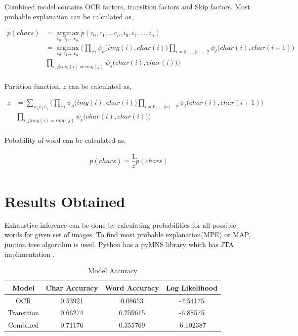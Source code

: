 \documentclass[paper=a4, fontsize=11pt]{scrartcl} %
\DeclareMathOperator*{\argmax}{argmax}
\newcommand*{\argmaxl}{\argmax\limits}
\numberwithin{equation}{section} %
\numberwithin{figure}{section} %
\numberwithin{table}{section} %
\begin{document}
Combined model contains OCR factors, transition factors and Skip factors. Most probable explanation can be calculated as,

\begin{align*}
	\tilde{p}(chars) & = \argmaxl_{c_0,c_1,...c_n} \tilde{p}(c_0,c_1,...c_n,i_0,i_1,...,i_n) \\
					 & = \argmaxl_{c_0,c_1,...c_n} \bigg( \displaystyle \prod_{\forall i}^{}  \psi_{o}\big(img(i),char(i)\big) \displaystyle \prod_{i=0,...,|w|-2}^{}  \psi_{t}\big(char(i),char(i+1)\big) \\ & \displaystyle \prod_{i,j|img(i)=img(j)}^{} \psi_{s}\big(char(i),char(i)\big) \bigg)\\
\end{align*}

Partition function, $z$ can be calculated as,

\begin{align*}
	z & = \displaystyle \sum_{\psi_{o} \psi_{t} \psi_{s}}^{} \bigg( \displaystyle \prod_{\forall i}^{}  \psi_{o}\big(img(i),char(i)\big) \displaystyle \prod_{i=0,...,|w|-2}^{}  \psi_{t}\big(char(i),char(i+1)\big) \\ & \displaystyle \prod_{i,j|img(i)=img(j)}^{} \psi_{s}\big(char(i),char(i)\big) \bigg)\\
\end{align*}

Pobability of word can be calculated as,

\begin{align*}
	p(chars) = \dfrac{1}{z} \tilde{p}(chars) \\
\end{align*}

\section{Results Obtained}

Exhaustive inference can be done by calculating probabilities for all possible words for given set of images. To find most probable explanation(MPE) or MAP, juntion tree algorithm is used. Python has a pyMNS library which has JTA implimentation \cite{pymns}.

\begin{table}[h!]
  \begin{center}
    \begin{tabular}{||c c c c||} 
    \hline
      Model & Char Accuracy & Word Accuracy & Log Likelihood \\ [0.5ex] 
    \hline\hline
      OCR &  0.53921 & 0.08653 & -7.54175 \\ 
    \hline
      Transition & 0.66274 & 0.259615 & -6.88575 \\
    \hline
      Combined &  0.71176 & 0.355769 & -6.102387 \\
    \hline
    \end{tabular}
    \caption{Model Accuracy} \label{table:1}
  \end{center}
\end{table}
\end{document}
